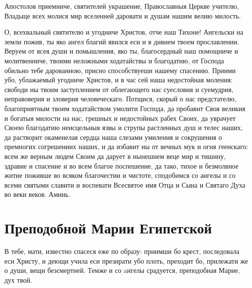 

Апостолов приемниче, святителей украшение, Православныя Церкве учителю, Владыце всех молися мир вселенней даровати и душам нашим велию милость.




О, всехвальный святителю и угодниче Христов, отче наш Тихоне! Ангельски на земли пожив, ты яко ангел благий явился еси и в дивнем твоем прославлении. Веруем от всея души и помышления, яко ты, благосердный наш помощниче и молитвенниче, твоими неложными ходатайствы и благодатию, от Господа обильно тебе дарованною, присно способствуеши нашему спасению. Приими убо, ублажаемый угодниче Христов, и в час сей наша недостойная моления: свободи ны твоим заступлением от облегающего нас суесловия и суемудрия, неправоверия и зловерия человеческаго. Потщися, скорый о нас предстателю, благоприятным твоим ходатайством умолити Господа, да пробавит Своя великия и богатыя милости на нас, грешных и недостойных рабех Своих, да уврачует Своею благодатию неисцельныя язвы и струпы растленных душ и телес наших, да растворит окаменелая сердца наша слезами умиления и сокрушения о премногих согрешениих наших, и да избавит ны от вечных мук и огня геенскаго: всем же верным людем Своим да дарует в нынешнем веце мир и тишину, здравие и спасение и во всем благое поспешение, да тако, тихое и безмолвное житие поживше во всяком благочестии и чистоте, сподобимся со ангелы и со всеми святыми славити и воспевати Всесвятое имя Отца и Сына и Святаго Духа во веки веков. Аминь.
\mychapterending


 

\section{Преподобной Марии Египетской}
 



В тебе, мати, известно спасеся еже по образу: приимши бо крест, последовала еси Христу, и деющи учила еси презирати убо плоть, преходит бо, прилежати же о души, вещи безсмертней. Темже и со aнгелы срадуется, преподобная Марие, дух твой.





